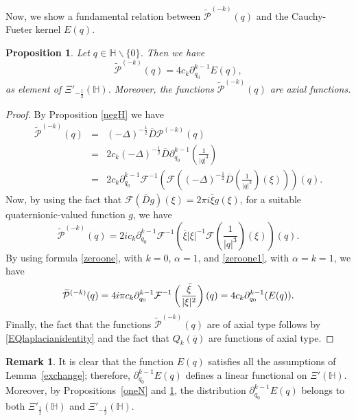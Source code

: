 \documentclass[reqno,11pt]{amsart}
\newtheorem{proposition}[theorem]{Proposition}
\theoremstyle{definition}
\newtheorem{remark}[theorem]{Remark}
\begin{document}
Now, we show a fundamental relation between $ \widetilde{\mathcal{P}}^{(-k)}(q)$ and the Cauchy-Fueter kernel $E(q)$.
\begin{proposition}
\label{neglapla}
	Let $q \in \mathbb{H} \backslash \{0\}$. Then we have
\begin{equation*}
 \widetilde{\mathcal{P}}^{(-k)}(q)=4c_k \partial_{q_0}^{k-1}E(q),
\end{equation*}
as element of $\Xi'_{-\frac{1}{2}}(\mathbb{H})$.  Moreover, the functions $\widetilde{\mathcal{P}}^{(-k)}(q)$ are axial functions.
\end{proposition}
\begin{proof}
By Proposition \ref{negH} we have
\begin{eqnarray*}
\widetilde{\mathcal{P}}^{(-k)}(q)&=& (-\Delta)^{-\frac{1}{2}}\overline{D} \mathcal{P}^{(-k)}(q)\\
&=& 2c_k (-\Delta)^{-\frac{1}{2}}\overline{D} \partial_{q_0}^{k-1} \left(\frac{1}{|q|^{3}}\right)\\
&=& 2c_k\partial_{q_0}^{k-1} \mathcal{F}^{-1}\left( \mathcal{F}\left((-\Delta)^{-\frac{1}{2}}\overline{D}\left( \frac{1}{|q|^{3}} \right) (\xi)\right)\right)(q).
\end{eqnarray*}
Now, by using the fact that $\mathcal{F}(\overline{D}g)(\xi)=2 \pi i \overline{\xi}g(\xi)$, for a suitable quaternionic-valued function $g$, we have
$$
\widetilde{\mathcal{P}}^{(-k)}(q)=2ic_k\partial_{q_0}^{k-1} \mathcal{F}^{-1}\left( \overline{\xi} | \xi|^{-1}\mathcal{F} \left(\frac{1}{|q|^{3}}\right)(\xi) \right)(q).
$$
By using formula \eqref{zeroone}, with $k=0$, $\alpha=1$, and \eqref{zeroone1}, with $\alpha=k=1$, we have
$$
	\widetilde{\mathcal{P}}^{(-k)}(q)=  4i \pi c_k
\partial_{q_0}^{k-1} \mathcal{F}^{-1}\left( \frac{\bar{\xi}}{|\xi|^2}\right)(q)\\
= 4c_k \partial_{q_0}^{k-1}  (E(q)).
$$
Finally, the fact that the functions $\widetilde{\mathcal{P}}^{(-k)}(q)$ are of axial type follows by \eqref{EQlaplacianidentity} and the fact that $Q_k(\overline{q})$ are functions of axial type.
\end{proof}

\begin{remark}
It is clear that the function $E(q)$ satisfies all the assumptions of Lemma~\ref{exchange}; therefore, $\partial_{q_0}^{k-1}E(q)$ defines a linear functional on $\Xi'(\mathbb{H})$. Moreover, by Propositions~\ref{oneN} and \ref{neglapla}, the distribution $\partial_{q_0}^{k-1}E(q)$ belongs to both $\Xi'_{\frac{1}{2}}(\mathbb{H})$ and $\Xi'_{-\frac{1}{2}}(\mathbb{H})$.
\end{remark}
\end{document}
